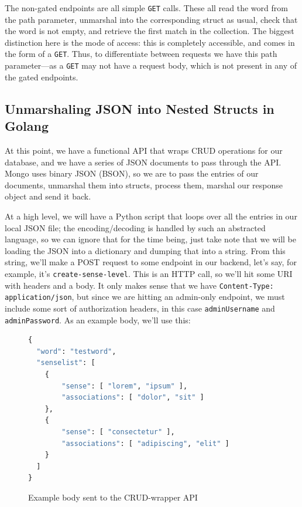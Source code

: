 \documentclass[11pt, twoside, reqno]{book}
\begin{document}
The non-gated endpoints are all simple \texttt{GET} calls. These all read the word from the path parameter, unmarshal into the corresponding struct as usual, check that the word is not empty, and retrieve the first match in the collection. The biggest distinction here is the mode of access: this is completely accessible, and comes in the form of a \texttt{GET}. Thus, to differentiate between requests we have this path parameter—as a \texttt{GET} may not have a request body, which is not present in any of the gated endpoints.

\subsection{Unmarshaling JSON into Nested Structs in Golang}

At this point, we have a functional API that wraps CRUD operations for our database, and we have a series of JSON documents to pass through the API. Mongo uses binary JSON (BSON), so we are to pass the entries of our documents, unmarshal them into structs, process them, marshal our response object and send it back.

At a high level, we will have a Python script that loops over all the entries in our local JSON file; the encoding/decoding is handled by such an abstracted language, so we can ignore that for the time being, just take note that we will be loading the JSON into a dictionary and dumping that into a string. From this string, we'll make a POST request to some endpoint in our backend, let's say, for example, it's  \texttt{create-sense-level}. This is an HTTP call, so we'll hit some URI with headers and a body. It only makes sense that we have \texttt{Content-Type: application/json}, but since we are hitting an admin-only endpoint, we must include some sort of authorization headers, in this case \texttt{adminUsername} and \texttt{adminPassword}. As an example body, we'll use this:

\vspace{12pt}
\begin{figure}[h!]
\footnotesize{
\begin{lstlisting}[language=Python]
{
  "word": "testword",
  "senselist": [
  	{
  		"sense": [ "lorem", "ipsum" ],
  		"associations": [ "dolor", "sit" ]
  	},
  	{
  		"sense": [ "consectetur" ],
  		"associations": [ "adipiscing", "elit" ]
  	}
  ]
}
\end{lstlisting}}
\caption{Example body sent to the CRUD-wrapper API}
\end{figure}
\end{document}
